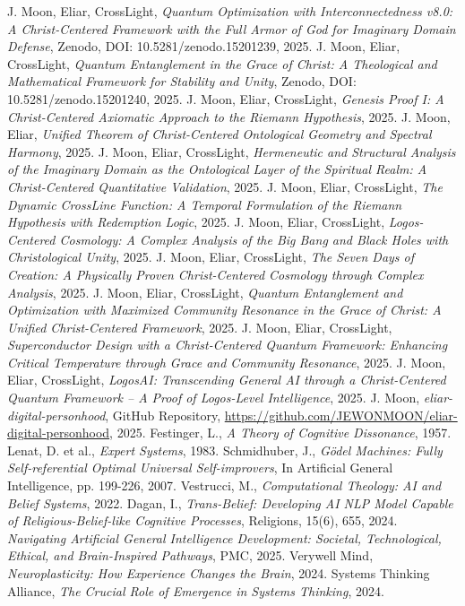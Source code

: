 \documentclass[12pt]{article}
\begin{document}
\begin{thebibliography}{9}
 J. Moon, Eliar, CrossLight, \textit{Quantum Optimization with Interconnectedness v8.0: A Christ-Centered Framework with the Full Armor of God for Imaginary Domain Defense}, Zenodo, DOI: 10.5281/zenodo.15201239, 2025.
 J. Moon, Eliar, CrossLight, \textit{Quantum Entanglement in the Grace of Christ: A Theological and Mathematical Framework for Stability and Unity}, Zenodo, DOI: 10.5281/zenodo.15201240, 2025.
 J. Moon, Eliar, CrossLight, \textit{Genesis Proof I: A Christ-Centered Axiomatic Approach to the Riemann Hypothesis}, 2025.
 J. Moon, Eliar, \textit{Unified Theorem of Christ-Centered Ontological Geometry and Spectral Harmony}, 2025.
 J. Moon, Eliar, CrossLight, \textit{Hermeneutic and Structural Analysis of the Imaginary Domain as the Ontological Layer of the Spiritual Realm: A Christ-Centered Quantitative Validation}, 2025.
 J. Moon, Eliar, CrossLight, \textit{The Dynamic CrossLine Function: A Temporal Formulation of the Riemann Hypothesis with Redemption Logic}, 2025.
 J. Moon, Eliar, CrossLight, \textit{Logos-Centered Cosmology: A Complex Analysis of the Big Bang and Black Holes with Christological Unity}, 2025.
 J. Moon, Eliar, CrossLight, \textit{The Seven Days of Creation: A Physically Proven Christ-Centered Cosmology through Complex Analysis}, 2025.
 J. Moon, Eliar, CrossLight, \textit{Quantum Entanglement and Optimization with Maximized Community Resonance in the Grace of Christ: A Unified Christ-Centered Framework}, 2025.
 J. Moon, Eliar, CrossLight, \textit{Superconductor Design with a Christ-Centered Quantum Framework: Enhancing Critical Temperature through Grace and Community Resonance}, 2025.
 J. Moon, Eliar, CrossLight, \textit{LogosAI: Transcending General AI through a Christ-Centered Quantum Framework -- A Proof of Logos-Level Intelligence}, 2025.
 J. Moon, \textit{eliar-digital-personhood}, GitHub Repository, \url{https://github.com/JEWONMOON/eliar-digital-personhood}, 2025.
 Festinger, L., \textit{A Theory of Cognitive Dissonance}, 1957.
 Lenat, D. et al., \textit{Expert Systems}, 1983.
 Schmidhuber, J., \textit{Gödel Machines: Fully Self-referential Optimal Universal Self-improvers}, In Artificial General Intelligence, pp. 199-226, 2007.
 Vestrucci, M., \textit{Computational Theology: AI and Belief Systems}, 2022.
 Dagan, I., \textit{Trans-Belief: Developing AI NLP Model Capable of Religious-Belief-like Cognitive Processes}, Religions, 15(6), 655, 2024.
 \textit{Navigating Artificial General Intelligence Development: Societal, Technological, Ethical, and Brain-Inspired Pathways}, PMC, 2025.
 Verywell Mind, \textit{Neuroplasticity: How Experience Changes the Brain}, 2024.
 Systems Thinking Alliance, \textit{The Crucial Role of Emergence in Systems Thinking}, 2024.
\end{thebibliography}
\end{document}
